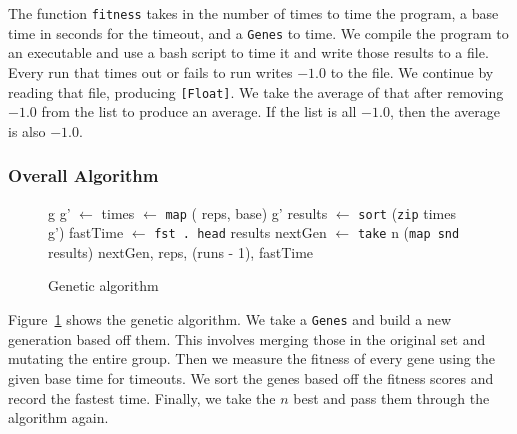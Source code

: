 \documentclass[preprint,nocopyrightspace]{sigplanconf}
\begin{document}
The function \lstinline!fitness! takes in the number of times to time the program, a base time in seconds for the timeout, and a \lstinline!Genes! to time. We compile the program to an executable and use a bash script to time it and write those results to a file. Every run that times out or fails to run writes $-1.0$ to the file. We continue by reading that file, producing \lstinline![Float]!. We take the average of that after removing $-1.0$ from the list to produce an average. If the list is all $-1.0$, then the average is also $-1.0$.
\subsubsection{Overall Algorithm}
\begin{figure}[t]
\begin{algorithmic}
 \State\Return g
\EndIf
\State g' $\gets$ 
\State times $\gets$ \lstinline!map! ( {reps, base}) g'
\State results $\gets$ \lstinline!sort! (\lstinline!zip! times g')
\State fastTime $\gets$ \lstinline!fst . head! results
\State nextGen $\gets$ \lstinline!take! n (\lstinline!map snd! results)
\State\Return{} {nextGen, reps, (runs - 1), fastTime}
\EndFunction
\end{algorithmic}
\caption{Genetic algorithm}
\label{alg:overall}
\end{figure}

Figure~\ref{alg:overall} shows the genetic algorithm. We take a \lstinline!Genes! and build a new generation based off them. This involves merging those in the original set and mutating the entire group. Then we measure the fitness of every gene using the given base time for timeouts. We sort the genes based off the fitness scores and record the fastest time. Finally, we take the $n$ best and pass them through the algorithm again.
\end{document}
